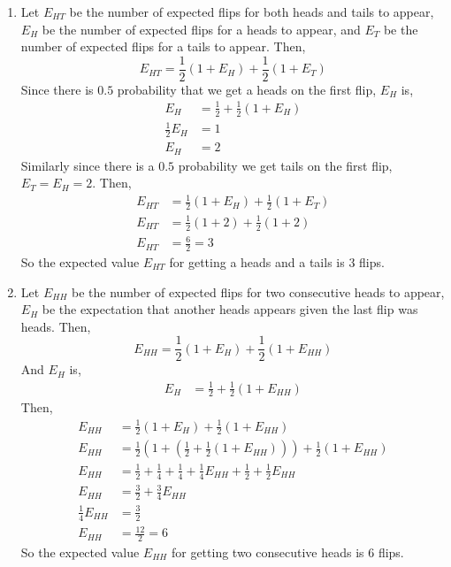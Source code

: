 \documentclass[12pt]{article}
\begin{document}
\begin{solution}
\begin{enumerate}
        \item Let $E_{HT}$ be the number of expected flips for both heads and tails to appear, $E_H$ be the number of expected flips for a heads to appear, and $E_T$ be the number of expected flips for a tails to appear.  Then, 
        \[E_{HT} = \frac{1}{2}(1+E_H) + \frac{1}{2}(1+E_{T}) \]
        Since there is $0.5$ probability that we get a heads on the first flip, $E_H$ is,  
        \begin{align*}
            E_H &= \frac{1}{2} + \frac{1}{2}(1+E_H) \\ 
            \frac{1}{2}E_H &= 1 \\ 
            E_H &= 2
        \end{align*}
        Similarly since there is a $0.5$ probability we get tails on the first flip, $E_T = E_H = 2$.    
        Then, 
        \begin{align*}
            E_{HT} &= \frac{1}{2}(1+E_H) + \frac{1}{2}(1+E_{T}) \\ 
            E_{HT} &= \frac{1}{2}(1+2) + \frac{1}{2}(1+2) \\ 
            E_{HT} &= \frac{6}{2} = 3
        \end{align*}
        So the expected value $E_{HT}$ for getting a heads and a tails is $3$ flips. 

        \item Let $E_{HH}$ be the number of expected flips for two consecutive heads to appear, $E_H$ be the expectation that another heads appears given the last flip was heads. Then, 
        \[E_{HH} = \frac{1}{2}(1+E_H) + \frac{1}{2}(1+E_{HH}) \]
        And $E_H$ is,  
        \begin{align*}
            E_H &= \frac{1}{2} + \frac{1}{2}(1+E_{HH}) 
        \end{align*}
        Then, 
        \begin{align*}
            E_{HH} &= \frac{1}{2}(1+E_H) + \frac{1}{2}(1+E_{HH}) \\ 
            E_{HH} &= \frac{1}{2}\left (1+ \left (\frac{1}{2} + \frac{1}{2}(1+E_{HH}) \right ) \right ) + \frac{1}{2}(1+E_{HH}) \\ 
            E_{HH} &= \frac{1}{2} + \frac{1}{4} + \frac{1}{4} + \frac{1}{4}E_{HH} + \frac{1}{2} + \frac{1}{2}E_{HH} \\
            E_{HH} &= \frac{3}{2} + \frac{3}{4}E_{HH} \\
            \frac{1}{4}E_{HH} &= \frac{3}{2} \\ 
            E_{HH} &= \frac{12}{2} = 6
        \end{align*}
        So the expected value $E_{HH}$ for getting two consecutive heads is $6$ flips. 
    \end{enumerate}
\end{solution}
\end{document}
